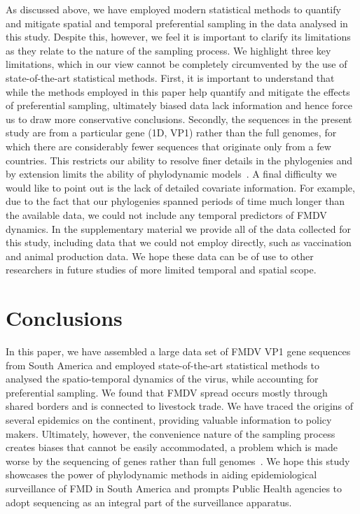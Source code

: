 \documentclass[10pt]{article}
\begin{document}
As discussed above, we have employed modern statistical methods to quantify and mitigate spatial and temporal preferential sampling in the data analysed in this study.
Despite this, however, we feel it is important to clarify its limitations as they relate to the nature of the sampling process.
We highlight three key limitations, which in our view cannot be completely circumvented by the use of state-of-the-art statistical methods. 
First, it is important to understand that while the methods employed in this paper help quantify and mitigate the effects of preferential sampling, ultimately biased data lack information and hence force us to draw more conservative conclusions.
Secondly, the sequences in the present study are from a particular gene (1D, VP1) rather than the full genomes, for which there are considerably fewer sequences that originate only from a few countries.
This restricts our ability to resolve finer details in the phylogenies and by extension limits the ability of phylodynamic models~\citep{Dudas2019}.
A final difficulty we would like to point out is the lack of detailed covariate information.
For example, due to the fact that our phylogenies spanned periods of time much longer than the available data, we could not include any temporal predictors of FMDV dynamics. %
In the supplementary material we provide all of the data collected for this study, including data that we could not employ directly, such as vaccination and animal production data.
We hope these data can be of use to other researchers in future studies of more limited temporal and spatial scope.

\section*{Conclusions}

In this paper, we have assembled a large data set of FMDV VP1 gene sequences from South America and employed state-of-the-art statistical methods to analysed the spatio-temporal dynamics of the virus, while accounting for preferential sampling. %
We found that FMDV spread occurs mostly through shared borders and  is connected to livestock trade.
We have traced the origins of several epidemics on the continent, providing valuable information to policy makers.
Ultimately, however, the convenience nature of the sampling process creates biases that cannot be easily accommodated, a problem which is made worse by the sequencing of genes rather than full genomes~\citep{Dudas2019}.
We hope this study showcases the power of phylodynamic methods in aiding epidemiological surveillance of FMD in South America and prompts Public Health agencies to adopt sequencing as an integral part of the surveillance apparatus. 
\end{document}
